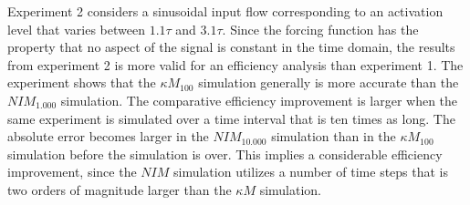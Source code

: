  
		Experiment 2 considers a sinusoidal input flow corresponding to an activation level that varies between $1.1\tau$ and $3.1\tau$.
		Since the forcing function has the property that no aspect of the signal is constant in the time domain, 
			the results from experiment 2 is more valid for an efficiency analysis than experiment 1.
		The experiment shows that the $\kappa M_{100}$ simulation generally is more accurate than the $NIM_{1.000}$ simulation.
		The comparative efficiency improvement is larger when the same experiment is simulated over a time interval that is ten times as long.
		The absolute error becomes larger in the $NIM_{10.000}$ simulation than in the $\kappa M_{100}$ simulation before the simulation is over.
		This implies a considerable efficiency improvement, since the $NIM$ simulation utilizes a number of time steps that is two orders of magnitude larger than the $\kappa M$ simulation.

